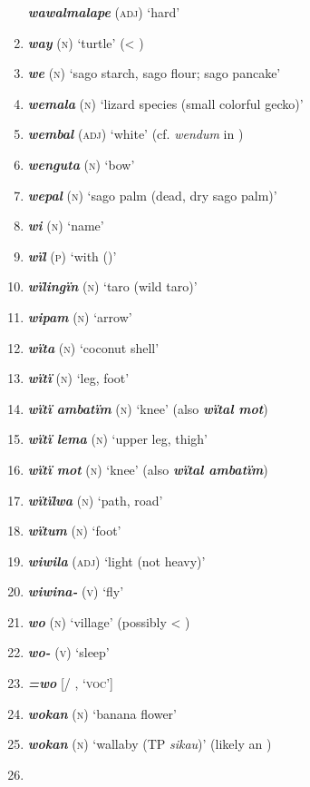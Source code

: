 \begin{enumerate}[noitemsep, label={}, align=left, widest=190, labelsep=1ex,leftmargin=*,itemindent=-10pt]
\textbf{\textit{wawalmalape}} (\textsc{adj}) ‘hard’ \item
\textbf{\textit{way}} (\textsc{n}) ‘turtle’ (< ) \item
\textbf{\textit{we}} (\textsc{n}) ‘sago starch, sago flour; sago pancake’ \item
\textbf{\textit{wemala}} (\textsc{n}) ‘lizard species (small colorful gecko)’ \item
\textbf{\textit{wembal}} (\textsc{adj}) ‘white’ (cf. \textit{wendum} in ) \item
\textbf{\textit{wenguta}} (\textsc{n}) ‘bow’ \item
\textbf{\textit{wepal}} (\textsc{n}) ‘sago palm (dead, dry sago palm)’ \item
\textbf{\textit{wi}} (\textsc{n}) ‘name’ \item
\textbf{\textit{wïl}} (\textsc{p)} ‘with ()’ \item
\textbf{\textit{wïlingïn}} (\textsc{n}) ‘taro (wild taro)’ \item
\textbf{\textit{wipam}} (\textsc{n}) ‘arrow’ \item
\textbf{\textit{wïta}} (\textsc{n}) ‘coconut shell’ \item
\textbf{\textit{wïtï}} (\textsc{n}) ‘leg, foot’ \item
\textbf{\textit{wïtï ambatïm}} (\textsc{n}) ‘knee’ (also \textbf{\textit{wïtal mot}}) \item
\textbf{\textit{wïtï lema}} (\textsc{n}) ‘upper leg, thigh’ \item
\textbf{\textit{wïtï mot}} (\textsc{n}) ‘knee’ (also \textbf{\textit{wïtal ambatïm}}) \item
\textbf{\textit{wïtïlwa}} (\textsc{n}) ‘path, road’ \item
\textbf{\textit{wïtum}} (\textsc{n}) ‘foot’ \item
\textbf{\textit{wiwila}} (\textsc{adj}) ‘light (not heavy)’ \item
\textbf{\textit{wiwina-}} (\textsc{v}) ‘fly’ \item
\textbf{\textit{wo}} (\textsc{n}) ‘village’ (possibly < ) \item
\textbf{\textit{wo-}} (\textsc{v}) ‘sleep’ \item
\textbf{\textit{=wo}} [/ , ‘\textsc{voc}’] \item
\textbf{\textit{wokan}} (\textsc{n}) ‘banana flower’ \item
\textbf{\textit{wokan}} (\textsc{n}) ‘wallaby (TP \textit{sikau})’ (likely an ) \item

\end{enumerate}

